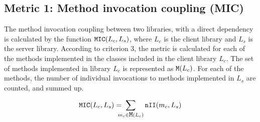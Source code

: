 \documentclass[a4paper]{article}
\begin{document}
\subsection{Metric 1: Method invocation coupling (MIC)}


The method invocation coupling between two libraries, with a direct dependency is calculated by the function $\verb|MIC|(L_c, L_s)$, where $L_c$ is the client library and $L_s$ is the server library.
According to criterion 3, the metric is calculated for each of the methods implemented in the classes included in the client library $L_c$. The set of methods implemented in library $L_c$ is represented as $\verb|M|(L_c)$.
For each of the methods, the number of individual invocations to methods implemented in $L_s$ are counted, and summed up.

\begin{equation*}
\verb|MIC|(L_c, L_s) =\!\!\!\!\! \sum_{m_c \in \verb|M|(L_c)} \verb|nII|(m_c, L_s)
\end{equation*}

\end{document}
